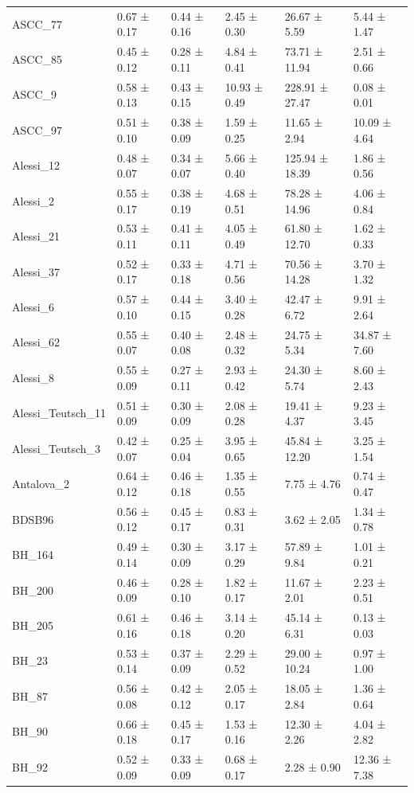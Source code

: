 \begin{tabular}{llllll}
ASCC_77 & 0.67 ± 0.17 & 0.44 ± 0.16 & 2.45 ± 0.30 & 26.67 ± 5.59 & 5.44 ± 1.47 \\
ASCC_85 & 0.45 ± 0.12 & 0.28 ± 0.11 & 4.84 ± 0.41 & 73.71 ± 11.94 & 2.51 ± 0.66 \\
ASCC_9 & 0.58 ± 0.13 & 0.43 ± 0.15 & 10.93 ± 0.49 & 228.91 ± 27.47 & 0.08 ± 0.01 \\
ASCC_97 & 0.51 ± 0.10 & 0.38 ± 0.09 & 1.59 ± 0.25 & 11.65 ± 2.94 & 10.09 ± 4.64 \\
Alessi_12 & 0.48 ± 0.07 & 0.34 ± 0.07 & 5.66 ± 0.40 & 125.94 ± 18.39 & 1.86 ± 0.56 \\
Alessi_2 & 0.55 ± 0.17 & 0.38 ± 0.19 & 4.68 ± 0.51 & 78.28 ± 14.96 & 4.06 ± 0.84 \\
Alessi_21 & 0.53 ± 0.11 & 0.41 ± 0.11 & 4.05 ± 0.49 & 61.80 ± 12.70 & 1.62 ± 0.33 \\
Alessi_37 & 0.52 ± 0.17 & 0.33 ± 0.18 & 4.71 ± 0.56 & 70.56 ± 14.28 & 3.70 ± 1.32 \\
Alessi_6 & 0.57 ± 0.10 & 0.44 ± 0.15 & 3.40 ± 0.28 & 42.47 ± 6.72 & 9.91 ± 2.64 \\
Alessi_62 & 0.55 ± 0.07 & 0.40 ± 0.08 & 2.48 ± 0.32 & 24.75 ± 5.34 & 34.87 ± 7.60 \\
Alessi_8 & 0.55 ± 0.09 & 0.27 ± 0.11 & 2.93 ± 0.42 & 24.30 ± 5.74 & 8.60 ± 2.43 \\
Alessi_Teutsch_11 & 0.51 ± 0.09 & 0.30 ± 0.09 & 2.08 ± 0.28 & 19.41 ± 4.37 & 9.23 ± 3.45 \\
Alessi_Teutsch_3 & 0.42 ± 0.07 & 0.25 ± 0.04 & 3.95 ± 0.65 & 45.84 ± 12.20 & 3.25 ± 1.54 \\
Antalova_2 & 0.64 ± 0.12 & 0.46 ± 0.18 & 1.35 ± 0.55 & 7.75 ± 4.76 & 0.74 ± 0.47 \\
BDSB96 & 0.56 ± 0.12 & 0.45 ± 0.17 & 0.83 ± 0.31 & 3.62 ± 2.05 & 1.34 ± 0.78 \\
BH_164 & 0.49 ± 0.14 & 0.30 ± 0.09 & 3.17 ± 0.29 & 57.89 ± 9.84 & 1.01 ± 0.21 \\
BH_200 & 0.46 ± 0.09 & 0.28 ± 0.10 & 1.82 ± 0.17 & 11.67 ± 2.01 & 2.23 ± 0.51 \\
BH_205 & 0.61 ± 0.16 & 0.46 ± 0.18 & 3.14 ± 0.20 & 45.14 ± 6.31 & 0.13 ± 0.03 \\
BH_23 & 0.53 ± 0.14 & 0.37 ± 0.09 & 2.29 ± 0.52 & 29.00 ± 10.24 & 0.97 ± 1.00 \\
BH_87 & 0.56 ± 0.08 & 0.42 ± 0.12 & 2.05 ± 0.17 & 18.05 ± 2.84 & 1.36 ± 0.64 \\
BH_90 & 0.66 ± 0.18 & 0.45 ± 0.17 & 1.53 ± 0.16 & 12.30 ± 2.26 & 4.04 ± 2.82 \\
BH_92 & 0.52 ± 0.09 & 0.33 ± 0.09 & 0.68 ± 0.17 & 2.28 ± 0.90 & 12.36 ± 7.38 \\

\end{tabular}
